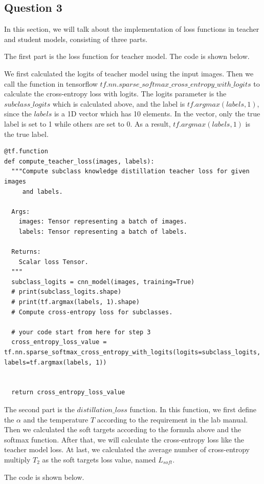 \documentclass[conference]{IEEEtran}
\begin{document}
\subsection{Question 3}
In this section, we will talk about the implementation of loss functions in teacher and student models, consisting of three parts.\par
The first part is the loss function for teacher model. The code is shown below.\par 
We first calculated the logits of teacher model using the input images. Then we call the function in tensorflow $tf.nn.sparse\_softmax\_cross\_entropy\_with\_logits$ to calculate the cross-entropy loss with logits. 
The logits parameter is the $subclass\_logits$ which is calculated above, and the label is $tf.argmax(labels, 1)$, since the $labels$ is a 1D vector which has 10 elements. In the vector, only the true label is set to 1 while others are set to 0.
As a result, $tf.argmax(labels, 1)$ is the true label.
\begin{lstlisting}
@tf.function
def compute_teacher_loss(images, labels):
  """Compute subclass knowledge distillation teacher loss for given images
     and labels.

  Args:
    images: Tensor representing a batch of images.
    labels: Tensor representing a batch of labels.

  Returns:
    Scalar loss Tensor.
  """
  subclass_logits = cnn_model(images, training=True)
  # print(subclass_logits.shape)
  # print(tf.argmax(labels, 1).shape)
  # Compute cross-entropy loss for subclasses.

  # your code start from here for step 3
  cross_entropy_loss_value = tf.nn.sparse_softmax_cross_entropy_with_logits(logits=subclass_logits, labels=tf.argmax(labels, 1))


  return cross_entropy_loss_value
\end{lstlisting}
The second part is the $distillation\_loss$ function. 
In this function, we first define the $\alpha$ and the temperature $T$ according to the requirement in the lab manual.
Then we calculated the soft targets according to the formula above and the softmax function.
After that, we will calculate the cross-entropy loss like the teacher model loss.
At last, we calculated the average number of cross-entropy multiply $T_{2}$ as the soft targets loss value, named $L_{soft}$.\par
The code is shown below.
\end{document}
